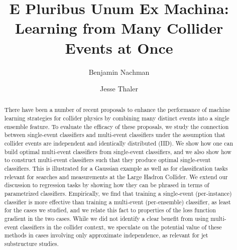 \documentclass[aps,prx,reprint,preprintnumbers,superscriptaddress,nofootinbib,longbibliography,floatfix]{revtex4-2}
\begin{document}

\title{E Pluribus Unum Ex Machina:\\ Learning from Many Collider Events at Once}

\author{Benjamin Nachman}

\author{Jesse Thaler}

\begin{abstract}
There have been a number of recent proposals to enhance the performance of machine learning strategies for collider physics by combining many distinct events into a single ensemble feature.
%
To evaluate the efficacy of these proposals, we study the connection between single-event classifiers and multi-event classifiers under the assumption that collider events are independent and identically distributed (IID).
%
We show how one can build optimal multi-event classifiers from single-event classifiers, and we also show how to construct multi-event classifiers such that they produce optimal single-event classifiers.
%
This is illustrated for a Gaussian example as well as for classification tasks relevant for searches and measurements at the Large Hadron Collider.
%
We extend our discussion to regression tasks by showing how they can be phrased in terms of parametrized classifiers.
%
Empirically, we find that training a single-event (per-instance) classifier is more effective than training a multi-event (per-ensemble) classifier, as least for the cases we studied, and we relate this fact to properties of the loss function gradient in the two cases.
%
While we did not identify a clear benefit from using multi-event classifiers in the collider context, we speculate on the potential value of these methods in cases involving only approximate independence, as relevant for jet substructure studies.
\end{abstract}

\maketitle

\end{document}
